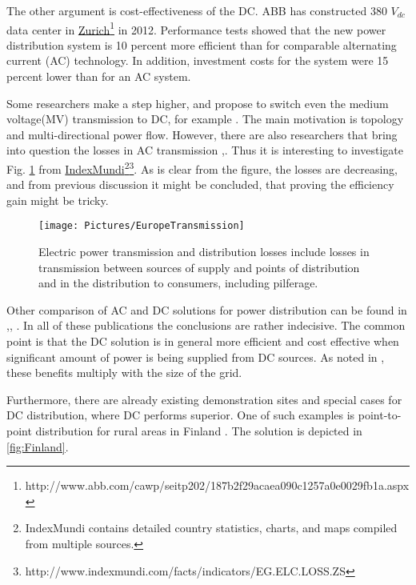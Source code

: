 \documentclass[]{scrartcl}
\begin{document}
The other argument is cost-effectiveness of the DC. ABB has constructed 380 $V_{dc}$ data center in \href{<http://www.abb.com/cawp/seitp202/187b2f29acaea090c1257a0e0029fb1a.aspx>}{Zurich}\footnote{http://www.abb.com/cawp/seitp202/187b2f29acaea090c1257a0e0029fb1a.aspx} in 2012. Performance tests showed that the new power distribution system is 10 percent more efficient than for comparable alternating current (AC) technology. In addition, investment costs for the system were 15 percent lower than for an AC system.

Some researchers make a step higher, and propose to switch even the medium voltage(MV) transmission to DC, for example \cite{Doncker2014}. The main motivation is topology and multi-directional power flow. However, there are also researchers that bring into question the losses in AC transmission \cite{Dragicevic2015},\cite{Dragicevic2014}. Thus it is interesting to investigate Fig. \ref{fig:EuropeTransmission} from \href{<http://www.indexmundi.com/facts/indicators/EG.ELC.LOSS.ZS>}{IndexMundi}\footnote{IndexMundi contains detailed country statistics, charts, and maps compiled from multiple sources.}\footnote{http://www.indexmundi.com/facts/indicators/EG.ELC.LOSS.ZS}. As is clear from the figure, the losses are decreasing, and from previous discussion it might be concluded, that proving the efficiency gain might be tricky.

\begin{figure}[h!]
	\centering
	\texttt{[image: Pictures/EuropeTransmission]}
	\caption{Electric power transmission and distribution losses include losses in transmission between sources of supply and points of distribution and in the distribution to consumers, including pilferage.}
	\label{fig:EuropeTransmission}
\end{figure}

Other comparison of AC and DC solutions for power distribution can be found in \cite{Starke2008},\cite{Evans2013}, \cite{Amin2011}. In all of these publications the conclusions are rather indecisive. The common point is that the DC solution is in general more efficient and cost effective when significant amount of power is being supplied from DC sources. As noted in \cite{Evans2013}, these benefits multiply with the size of the grid. 

Furthermore, there are already existing demonstration sites and special cases for DC distribution, where DC performs superior. One of such examples is point-to-point distribution for rural areas in Finland \cite{Hakala2015a}. The solution is depicted in \ref{fig:Finland}. 
 
\end{document}
